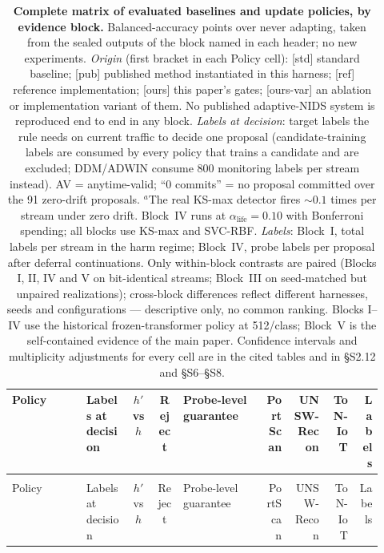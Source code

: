 \begin{landscape}
{\scriptsize
\setlength{\tabcolsep}{2pt}
\renewcommand{\arraystretch}{1.08}
\setlength{\LTcapwidth}{\linewidth}
\begin{longtable}{>{\raggedright\arraybackslash}p{0.20\linewidth} >{\raggedright\arraybackslash}p{0.12\linewidth} c c >{\raggedright\arraybackslash}p{0.22\linewidth} r r r r}
\caption{\textbf{Complete matrix of evaluated baselines and update policies, by evidence
block.} Balanced-accuracy points over never adapting, taken from the sealed outputs of the
block named in each header; no new experiments. \emph{Origin} (first bracket in each Policy
cell): [std] standard baseline; [pub] published method instantiated in this harness; [ref]
reference implementation; [ours] this paper's gates; [ours-var] an ablation or
implementation variant of them. No published adaptive-NIDS system is reproduced end to end
in any block. \emph{Labels at decision}: target labels the rule needs on current traffic to
decide one proposal (candidate-training labels are consumed by every policy that trains a
candidate and are excluded; DDM/ADWIN consume 800 monitoring labels per stream instead).
AV = anytime-valid; ``0 commits'' = no proposal committed over the 91 zero-drift proposals.
$^{a}$The real KS-max detector fires ${\sim}0.1$ times per stream under zero drift.
Block~IV runs at $\alpha_{\mathrm{life}}{=}0.10$ with Bonferroni spending; all blocks use
KS-max and SVC-RBF. \emph{Labels}: Block~I, total labels per stream in the harm regime;
Block~IV, probe labels per proposal after deferral continuations. Only within-block
contrasts are paired (Blocks I, II, IV and V on bit-identical streams; Block~III on
seed-matched but unpaired realizations); cross-block differences reflect different
harnesses, seeds and configurations --- descriptive only, no common ranking. Blocks I--IV
use the historical frozen-transformer policy at 512/class; Block~V is the self-contained
evidence of the main paper. Confidence intervals and multiplicity adjustments for every
cell are in the cited tables and in \S S2.12 and \S S6--\S S8.}
\label{tab:baselines_full}\\
\toprule
Policy & Labels at decision & $h'$ vs $h$ & Reject & Probe-level guarantee & PortScan & UNSW-Recon & ToN-IoT & Labels \\
\midrule
\endfirsthead
\multicolumn{9}{l}{\small Table~\ref{tab:baselines_full} continued}\\
\toprule
Policy & Labels at decision & $h'$ vs $h$ & Reject & Probe-level guarantee & PortScan & UNSW-Recon & ToN-IoT & Labels \\

\end{longtable}}
\end{landscape}
